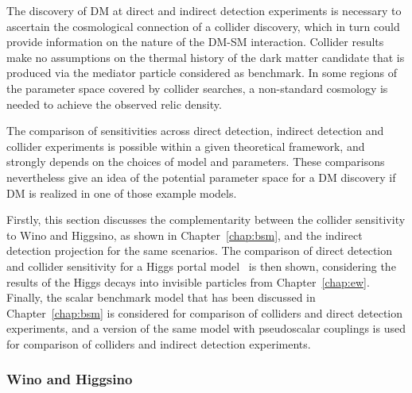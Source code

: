\documentclass[../report.tex]{subfiles}
\begin{document}

The discovery of DM at direct and indirect detection experiments is necessary to ascertain the cosmological connection of a collider discovery, which in turn could provide information on the nature of the DM-SM interaction. 
Collider results make no assumptions on the thermal history of the dark matter candidate that is produced via the mediator particle considered as benchmark. In some regions of the parameter space covered by collider searches, a non-standard cosmology is needed to achieve the observed relic density.

The comparison of sensitivities across direct detection, indirect detection and collider experiments is possible within a given theoretical framework, and strongly depends on the choices of model and parameters. 
These comparisons nevertheless give an idea of the potential parameter space for a DM discovery if DM is realized in one of those example models. 

Firstly, this section discusses the complementarity between the collider sensitivity to Wino and Higgsino, as shown in Chapter~\ref{chap:bsm}, and the indirect detection projection for the same scenarios.
The comparison of direct detection and collider sensitivity for a Higgs portal model~\cite{Patt:2006fw,Djouadi:2011aa} is then shown, considering the results of the Higgs decays into invisible particles from Chapter~\ref{chap:ew}. Finally, the scalar benchmark model that has been discussed in Chapter~\ref{chap:bsm} is considered for comparison of colliders and direct detection experiments,  and a version of the same model with pseudoscalar couplings is used for comparison of colliders and indirect detection experiments.

\subsubsection*{Wino and Higgsino}
\end{document}
